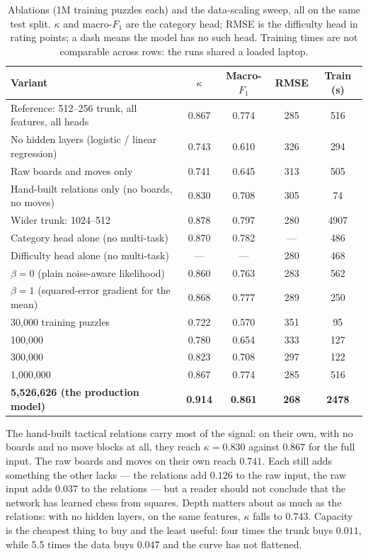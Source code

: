 \begin{table}[H]
\centering
\small
\caption{Ablations (1M training puzzles each) and the data-scaling sweep, all on the same test
split. $\kappa$ and macro-$F_1$ are the category head; RMSE is the difficulty head in rating points; a
dash means the model has no such head. Training times are not comparable across rows: the runs
shared a loaded laptop.}\label{tab:nn-ablations}
\begin{tabularx}{\linewidth}{Xcccc}
\toprule
\textbf{Variant} & \textbf{$\kappa$} & \textbf{Macro-$F_1$} & \textbf{RMSE} & \textbf{Train (s)} \\
\midrule
Reference: 512--256 trunk, all features, all heads & 0.867 & 0.774 & 285 & 516 \\
\midrule
No hidden layers (logistic / linear regression) & 0.743 & 0.610 & 326 & 294 \\
Raw boards and moves only & 0.741 & 0.645 & 313 & 505 \\
Hand-built relations only (no boards, no moves) & 0.830 & 0.708 & 305 & 74 \\
Wider trunk: 1024--512 & 0.878 & 0.797 & 280 & 4907 \\
\midrule
Category head alone (no multi-task) & 0.870 & 0.782 & --- & 486 \\
Difficulty head alone (no multi-task) & --- & --- & 280 & 468 \\
$\beta = 0$ (plain noise-aware likelihood) & 0.860 & 0.763 & 283 & 562 \\
$\beta = 1$ (squared-error gradient for the mean) & 0.868 & 0.777 & 289 & 250 \\
\midrule
30{,}000 training puzzles & 0.722 & 0.570 & 351 & 95 \\
100{,}000 & 0.780 & 0.654 & 333 & 127 \\
300{,}000 & 0.823 & 0.708 & 297 & 122 \\
1{,}000{,}000 & 0.867 & 0.774 & 285 & 516 \\
\textbf{5{,}526{,}626 (the production model)} & \textbf{0.914} & \textbf{0.861} & \textbf{268} & \textbf{2478} \\
\bottomrule
\end{tabularx}
\end{table}

\begin{finding}
The hand-built tactical relations carry most of the signal: on their own, with no boards and no move
blocks at all, they reach $\kappa = 0.830$ against $0.867$ for the full input. The raw boards and
moves on their own reach $0.741$. Each still adds something the other lacks --- the relations add
$0.126$ to the raw input, the raw input adds $0.037$ to the relations --- but a reader should not
conclude that the network has learned chess from squares. Depth matters about as much as the
relations: with no hidden layers, on the same features, $\kappa$ falls to $0.743$. Capacity is the
cheapest thing to buy and the least useful: four times the trunk buys $0.011$, while 5.5 times the
data buys $0.047$ and the curve has not flattened.
\end{finding}

